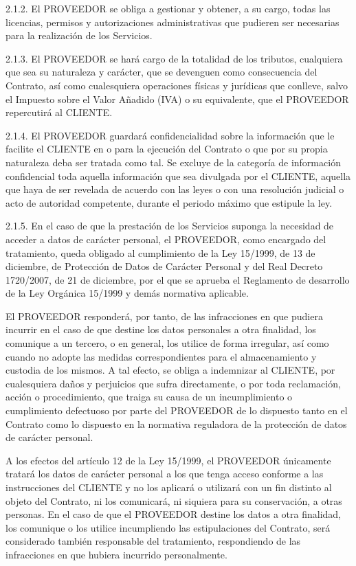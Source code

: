 \documentclass['12pt',spanish,a4paper,]{article}
\begin{document}
2.1.2. El PROVEEDOR se obliga a gestionar y obtener, a su cargo, todas
las licencias, permisos y autorizaciones administrativas que pudieren
ser necesarias para la realización de los Servicios.

2.1.3. El PROVEEDOR se hará cargo de la totalidad de los tributos,
cualquiera que sea su naturaleza y carácter, que se devenguen como
consecuencia del Contrato, así como cualesquiera operaciones físicas y
jurídicas que conlleve, salvo el Impuesto sobre el Valor Añadido (IVA) o
su equivalente, que el PROVEEDOR repercutirá al CLIENTE.

2.1.4. El PROVEEDOR guardará confidencialidad sobre la información que
le facilite el CLIENTE en o para la ejecución del Contrato o que por su
propia naturaleza deba ser tratada como tal. Se excluye de la categoría
de información confidencial toda aquella información que sea divulgada
por el CLIENTE, aquella que haya de ser revelada de acuerdo con las
leyes o con una resolución judicial o acto de autoridad competente,
durante el periodo máximo que estipule la ley.

2.1.5. En el caso de que la prestación de los Servicios suponga la
necesidad de acceder a datos de carácter personal, el PROVEEDOR, como
encargado del tratamiento, queda obligado al cumplimiento de la Ley
15/1999, de 13 de diciembre, de Protección de Datos de Carácter Personal
y del Real Decreto 1720/2007, de 21 de diciembre, por el que se aprueba
el Reglamento de desarrollo de la Ley Orgánica 15/1999 y demás normativa
aplicable.

El PROVEEDOR responderá, por tanto, de las infracciones en que pudiera
incurrir en el caso de que destine los datos personales a otra
finalidad, los comunique a un tercero, o en general, los utilice de
forma irregular, así como cuando no adopte las medidas correspondientes
para el almacenamiento y custodia de los mismos. A tal efecto, se obliga
a indemnizar al CLIENTE, por cualesquiera daños y perjuicios que sufra
directamente, o por toda reclamación, acción o procedimiento, que traiga
su causa de un incumplimiento o cumplimiento defectuoso por parte del
PROVEEDOR de lo dispuesto tanto en el Contrato como lo dispuesto en la
normativa reguladora de la protección de datos de carácter personal.

A los efectos del artículo 12 de la Ley 15/1999, el PROVEEDOR únicamente
tratará los datos de carácter personal a los que tenga acceso conforme a
las instrucciones del CLIENTE y no los aplicará o utilizará con un fin
distinto al objeto del Contrato, ni los comunicará, ni siquiera para su
conservación, a otras personas. En el caso de que el PROVEEDOR destine
los datos a otra finalidad, los comunique o los utilice incumpliendo las
estipulaciones del Contrato, será considerado también responsable del
tratamiento, respondiendo de las infracciones en que hubiera incurrido
personalmente.
\end{document}
